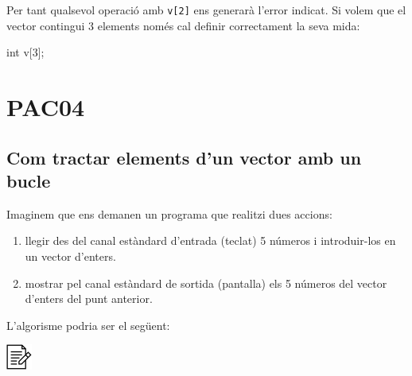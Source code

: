 \documentclass[]{book}
\newenvironment{Shaded}{\begin{snugshade}}{\end{snugshade}}
\newcommand{\DataTypeTok}[1]{\textcolor[rgb]{0.13,0.29,0.53}{#1}}
\newcommand{\DecValTok}[1]{\textcolor[rgb]{0.00,0.00,0.81}{#1}}
\newcommand{\NormalTok}[1]{#1}
\providecommand{\tightlist}{%
  \setlength{\itemsep}{0pt}\setlength{\parskip}{0pt}}
\begin{document}
Per tant qualsevol operació amb \texttt{v{[}2{]}} ens generarà l'error
indicat. Si volem que el vector contingui 3 elements només cal definir
correctament la seva mida:

\begin{Shaded}
\begin{Highlighting}[]
\DataTypeTok{int}\NormalTok{ v[}\DecValTok{3}\NormalTok{];}
\end{Highlighting}
\end{Shaded}

\chapter{PAC04}\label{pac04}

\section{Com tractar elements d'un vector amb un
bucle}\label{com-tractar-elements-dun-vector-amb-un-bucle}

Imaginem que ens demanen un programa que realitzi dues accions:

\begin{enumerate}
\def\labelenumi{\arabic{enumi}.}
\tightlist
\item
  llegir des del canal estàndard d'entrada (teclat) 5 números i
  introduir-los en un vector d'enters.
\item
  mostrar pel canal estàndard de sortida (pantalla) els 5 números del
  vector d'enters del punt anterior.
\end{enumerate}

L'algorisme podria ser el següent:

\includegraphics{./img/alg.png}
\end{document}
